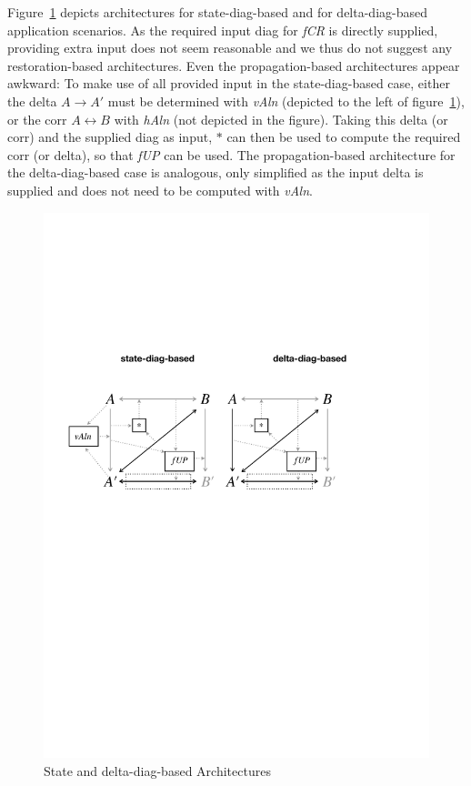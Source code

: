 Figure~\ref{fig:stateAndDeltaBasedDiag} depicts architectures for state-diag-based and for delta-diag-based application scenarios.
As the required input diag for \emph{fCR} is directly supplied, providing extra input does not seem reasonable and we thus do not suggest any restoration-based architectures.
Even the propagation-based architectures appear awkward:  To make use of all provided input in the state-diag-based case, either the delta $A \rightarrow A'$ must be determined with \emph{vAln} (depicted to the left of figure~\ref{fig:stateAndDeltaBasedDiag}), or the corr $A \leftrightarrow B$ with \emph{hAln} (not depicted in the figure).  
Taking this delta (or corr) and the supplied diag as input, $\ast$ can then be used to compute the required corr (or delta), so that \emph{fUP} can be used.
The propagation-based architecture for the delta-diag-based case is analogous, only simplified as the input delta is supplied and does not need to be computed with \emph{vAln}.
\begin{figure}[tb!]
	\centering
	\includegraphics[width=0.82\columnwidth]{diagrams/foundations/state-and-delta-diag-based}
	\caption{State and delta-diag-based Architectures}
	\label{fig:stateAndDeltaBasedDiag}
\end{figure}

